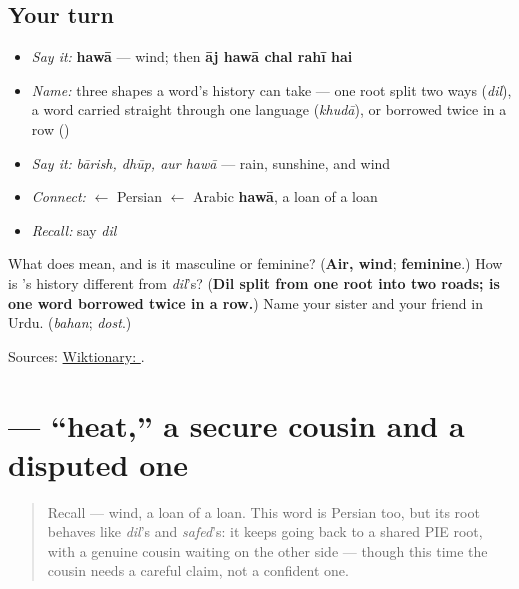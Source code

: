 \subsection*{Your turn}
\begin{itemize}
\raggedright
  \item \emph{Say it:} \textbf{hawā} — wind; then \textbf{āj hawā chal rahī hai}
  \item \emph{Name:} three shapes a word's history can take — one root split two ways (\emph{dil}), a word carried straight through one language (\emph{khudā}), or borrowed twice in a row (\textbf{})
  \item \emph{Say it:} \emph{bārish, dhūp, aur hawā} — rain, sunshine, and wind
  \item \emph{Connect:} \textbf{} $\leftarrow$ Persian $\leftarrow$ Arabic \textbf{hawā}, a loan of a loan
  \item \emph{Recall:} say \emph{dil}
\end{itemize}

\begin{tcolorbox}[breakable,colback=teal!4,colframe=teal!35!black,title={Before you move on}]
What does \textbf{} mean, and is it masculine or feminine? (\textbf{Air, wind}; \textbf{feminine}.) How is \textbf{}'s history different from \emph{dil}'s? (\textbf{Dil split from one root into two roads;  is one word borrowed twice in a row.}) Name your sister and your friend in Urdu. (\emph{bahan}; \emph{dost}.)

Sources: \href{https://en.wiktionary.org/wiki/\%DB\%81\%D9\%88\%D8\%A7}{Wiktionary: }.
\end{tcolorbox}
\section[\texorpdfstring{\ur{گرمی} (garmī)}{گرمی (garmī)}]{ — \textquotedblleft{}heat,\textquotedblright{} a secure cousin and a disputed one}

\label{lesson:UR-C15-garmi}



\begin{quote}
Recall \textbf{} — wind, a loan of a loan. This word is Persian too, but its root behaves like \emph{dil}'s and \emph{safed}'s: it keeps going back to a shared PIE root, with a genuine cousin waiting on the other side — though this time the cousin needs a careful claim, not a confident one.
\end{quote}

